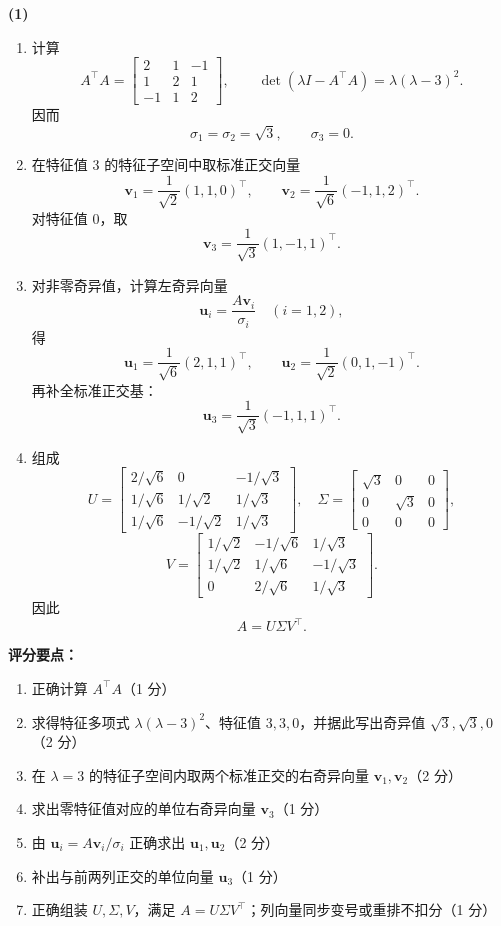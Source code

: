 \documentclass[10pt,a4paper]{exam-zh}
\newcommand{\bvec}[1]{\boldsymbol{#1}}
\newenvironment{grading}
  {\par\smallskip\Needspace{5\baselineskip}\small
   \noindent\textcolor{gradingred}{\textbf{评分要点：}}
   \begin{enumerate}[label=\textcolor{gradingred}{\arabic*.},
     leftmargin=2.4em,itemsep=0pt,topsep=2pt,parsep=0pt]}
  {\end{enumerate}\smallskip}
\newcommand{\gradeitem}[2]{\item #1（\textcolor{gradingred}{#2 分}）}
\newenvironment{answersteps}
  {\begin{enumerate}[label=\textbf{步骤 \arabic*.},
    leftmargin=4.8em,labelsep=0.6em,itemsep=2pt,topsep=3pt,parsep=0pt]}
  {\end{enumerate}}
\newcommand{\subanswer}[1]{%
  \par\medskip\Needspace{6\baselineskip}\noindent\textbf{#1}\par}
\begin{document}
\begin{solution}
\subanswer{(1)}
\begin{answersteps}
  \item 计算
  \[
  A^\top A=
  \begin{bmatrix}
  2&1&-1\\
  1&2&1\\
  -1&1&2
  \end{bmatrix},
  \qquad
  \det(\lambda I-A^\top A)=\lambda(\lambda-3)^2.
  \]
  因而
  \[
  \sigma_1=\sigma_2=\sqrt3,\qquad \sigma_3=0.
  \]
  \item 在特征值 $3$ 的特征子空间中取标准正交向量
  \[
  \bvec v_1=\frac1{\sqrt2}(1,1,0)^\top,
  \qquad
  \bvec v_2=\frac1{\sqrt6}(-1,1,2)^\top.
  \]
  对特征值 $0$，取
  \[
  \bvec v_3=\frac1{\sqrt3}(1,-1,1)^\top.
  \]
  \item 对非零奇异值，计算左奇异向量
  \[
  \bvec u_i=\frac{A\bvec v_i}{\sigma_i}\quad(i=1,2),
  \]
  得
  \[
  \bvec u_1=\frac1{\sqrt6}(2,1,1)^\top,
  \qquad
  \bvec u_2=\frac1{\sqrt2}(0,1,-1)^\top.
  \]
  再补全标准正交基：
  \[
  \bvec u_3=\frac1{\sqrt3}(-1,1,1)^\top.
  \]
  \item 组成
  \[
  U=
  \begin{bmatrix}
  2/\sqrt6&0&-1/\sqrt3\\
  1/\sqrt6&1/\sqrt2&1/\sqrt3\\
  1/\sqrt6&-1/\sqrt2&1/\sqrt3
  \end{bmatrix},
  \quad
  \Sigma=
  \begin{bmatrix}
  \sqrt3&0&0\\
  0&\sqrt3&0\\
  0&0&0
  \end{bmatrix},
  \]
  \[
  V=
  \begin{bmatrix}
  1/\sqrt2&-1/\sqrt6&1/\sqrt3\\
  1/\sqrt2&1/\sqrt6&-1/\sqrt3\\
  0&2/\sqrt6&1/\sqrt3
  \end{bmatrix}.
  \]
  因此
  \[
  \boxed{A=U\Sigma V^\top}.
  \]
\end{answersteps}
\begin{grading}
  \gradeitem{正确计算 $A^\top A$}{1}
  \gradeitem{求得特征多项式 $\lambda(\lambda-3)^2$、特征值
  $3,3,0$，并据此写出奇异值 $\sqrt3,\sqrt3,0$}{2}
  \gradeitem{在 $\lambda=3$ 的特征子空间内取两个标准正交的右奇异向量
  $\bvec v_1,\bvec v_2$}{2}
  \gradeitem{求出零特征值对应的单位右奇异向量 $\bvec v_3$}{1}
  \gradeitem{由 $\bvec u_i=A\bvec v_i/\sigma_i$ 正确求出
  $\bvec u_1,\bvec u_2$}{2}
  \gradeitem{补出与前两列正交的单位向量 $\bvec u_3$}{1}
  \gradeitem{正确组装 $U,\Sigma,V$，满足 $A=U\Sigma V^\top$；列向量同步变号或重排不扣分}{1}
\end{grading}


\end{solution}
\end{document}
